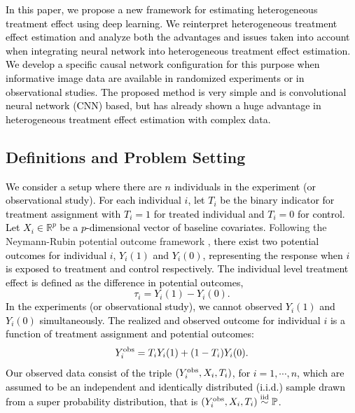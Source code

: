 \documentclass[11pt,paper=letter]{scrartcl}
\def\P{\mathbb{P}}
\newcommand{\iid}{\stackrel{\mathrm{iid}}{\sim}}
\def\obs{\textnormal{obs}}
\newcommand\hz[1]{\textcolor{black}{#1}}
\begin{document}

\hz{In this paper, we propose a new framework for estimating heterogeneous treatment effect using deep learning. We reinterpret heterogeneous treatment effect estimation and analyze both the advantages and issues taken into account when integrating neural network into heterogeneous treatment effect estimation. We develop a specific causal network configuration for this purpose when informative image data are available in randomized experiments or in observational studies. The proposed method is very simple and is convolutional neural network (CNN) based, but has already shown a huge advantage in heterogeneous treatment effect estimation with complex data.}



\subsection{Definitions and Problem Setting}
\hz{We consider a setup where there are $n$ individuals in the experiment (or observational study). For each individual $i$, let $T_i$ be the binary indicator for treatment assignment with $T_i=1$ for treated individual and $T_i=0$ for control. Let $X_i\in \mathbb{R}^p$ be a $p$-dimensional vector of baseline covariates.} Following the Neymann-Rubin potential outcome framework \cite{neyman1923potential, rubin1974estimating}, 
\hz{there exist  two potential outcomes for individual $i$, $Y_i(1)$ and $Y_i(0)$, representing the response when $i$ is exposed to treatment and control respectively.  The individual level treatment effect is defined as the difference in potential outcomes,
$$
\tau_i = Y_i(1)-Y_i(0).
$$
In the experiments (or observational study), we cannot observed $Y_i(1)$ and $Y_i(0)$ simultaneously. The realized and observed outcome for individual $i$ is a function of treatment assignment and potential outcomes:
$$
Y_i^\obs = T_i Y_i(1) + (1 -  T_i) Y_i(0).
$$
}%
\hz{Our observed data consist of the triple $(Y_i^\obs,X_i,T_i)$, for $i=1,\cdots,n$, which are assumed to be an independent and identically distributed (i.i.d.) sample drawn from a super probability distribution, that is $(Y_i^\obs,X_i,T_i)\iid \P $.}
\end{document}
